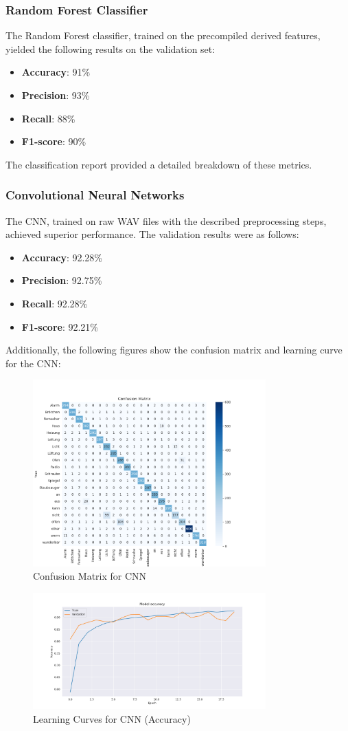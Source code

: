 \subsubsection{Random Forest Classifier}
The Random Forest classifier, trained on the precompiled derived features, yielded the following results on the validation set:
\begin{itemize}
    \item \textbf{Accuracy}: 91\%
    \item \textbf{Precision}: 93\%
    \item \textbf{Recall}: 88\%
    \item \textbf{F1-score}: 90\%
\end{itemize}
The classification report provided a detailed breakdown of these metrics.

\subsubsection{Convolutional Neural Networks}
The CNN, trained on raw WAV files with the described preprocessing steps, achieved superior performance. The validation results were as follows:
\begin{itemize}
    \item \textbf{Accuracy}: 92.28\%
    \item \textbf{Precision}: 92.75\%
    \item \textbf{Recall}: 92.28\%
    \item \textbf{F1-score}: 92.21\%
\end{itemize}

Additionally, the following figures show the confusion matrix and learning curve for the CNN:
\begin{figure}[h!]
    \centering
    \includegraphics[width=0.8\textwidth]{fig/confusion_matrix.png}
    \caption{Confusion Matrix for CNN}
\end{figure}

\begin{figure}[h!]
    \centering
    \includegraphics[width=0.8\textwidth]{fig/learning_curves_accuracy.png}
    \caption{Learning Curves for CNN (Accuracy)}
\end{figure}
